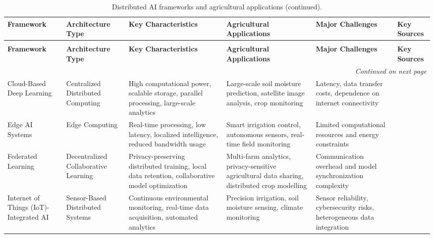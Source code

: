 \documentclass[land,article,submit,pdftex,moreauthors]{Definitions/mdpi}
\numberwithin{equation}{section}
\begin{document}
\begin{longtable}{p{1.4cm} p{1.4cm} p{3.2cm} p{3.2cm} p{2.4cm} p{1.6cm}}
\caption{Distributed AI frameworks and agricultural applications.}
\label{tab:distributed_ai} \\
\toprule
\textbf{Framework} &
\textbf{Architecture Type} &
\textbf{Key Characteristics} &
\textbf{Agricultural Applications} &
\textbf{Major Challenges} &
\textbf{Key Sources} \\
\midrule
\endfirsthead

\caption[]{Distributed AI frameworks and agricultural applications (continued).} \\
\toprule
\textbf{Framework} &
\textbf{Architecture Type} &
\textbf{Key Characteristics} &
\textbf{Agricultural Applications} &
\textbf{Major Challenges} &
\textbf{Key Sources} \\
\midrule
\endhead

\midrule
\multicolumn{6}{r}{\footnotesize\textit{Continued on next page}} \\
\midrule
\endfoot

\bottomrule
\endlastfoot

Cloud-Based Deep Learning &
Centralized Distributed Computing &
High computational power, scalable storage, parallel processing, large-scale analytics &
Large-scale soil moisture prediction, satellite image analysis, crop monitoring &
Latency, data transfer costs, dependence on internet connectivity &
\citep{Kamilaris2018, Liakos2018} \\ \hline

Edge AI Systems &
Edge Computing &
Real-time processing, low latency, localized intelligence, reduced bandwidth usage &
Smart irrigation control, autonomous sensors, real-time field monitoring &
Limited computational resources and energy constraints &
\citep{Tariq, s25175302} \\ \hline

Federated Learning &
Decentralized Collaborative Learning &
Privacy-preserving distributed training, local data retention, collaborative model optimization &
Multi-farm analytics, privacy-sensitive agricultural data sharing, distributed crop modelling &
Communication overhead and model synchronization complexity &
\citep{Yang3298981, Li2020_FL} \\ \hline

Internet of Things (IoT)-Integrated AI &
Sensor-Based Distributed Systems &
Continuous environmental monitoring, real-time data acquisition, automated analytics &
Precision irrigation, soil moisture sensing, climate monitoring &
Sensor reliability, cybersecurity risks, heterogeneous data integration &
\citep{Paria2025, Khanna2019, Ayaz2019} \\ \hline


\end{longtable}
\end{document}
